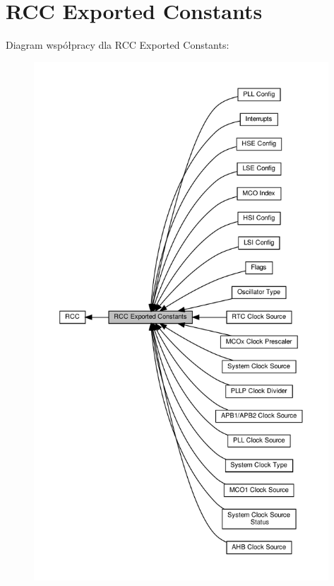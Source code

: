 \hypertarget{group___r_c_c___exported___constants}{}\section{R\+CC Exported Constants}
\label{group___r_c_c___exported___constants}
Diagram współpracy dla R\+CC Exported Constants\+:\nopagebreak
\begin{figure}[H]
\begin{center}
\leavevmode
\includegraphics[height=550pt]{group___r_c_c___exported___constants}
\end{center}
\end{figure}

